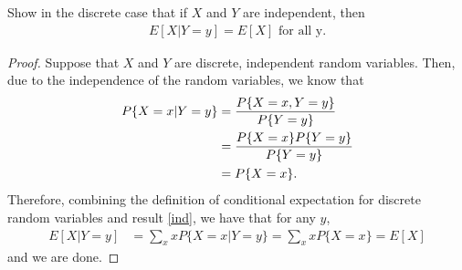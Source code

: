 \begin{problem}{3.9}
  Show in the discrete case that if $X$ and $Y$ are independent, then
  \begin{align*}
    E[X|Y=y] = E[X] \text{ for all y.}
  \end{align*}
\end{problem}

\begin{proof}
  Suppose that $X$ and $Y$ are discrete, independent random variables. Then, due to
  the independence of the random variables, we know that
  \begin{align}\label{ind}
    P\{X=x|Y=y\} &= \frac{P\{X=x, Y=y\}}{P\{Y=y\}} \notag\\
    &= \frac{P\{X=x\}P\{Y=y\}}{P\{Y=y\}} \notag\\
    &= P\{X=x\}.
  \end{align}
  Therefore, combining the definition of conditional expectation for discrete random variables
  and result \eqref{ind}, we have that for any $y$,
  \begin{align*}
    E[X|Y=y] &= \sum_x x P\{X=x | Y=y\} = \sum_x x P\{X=x\} = E[X]
  \end{align*}
  and we are done.
\end{proof}
\newpage
